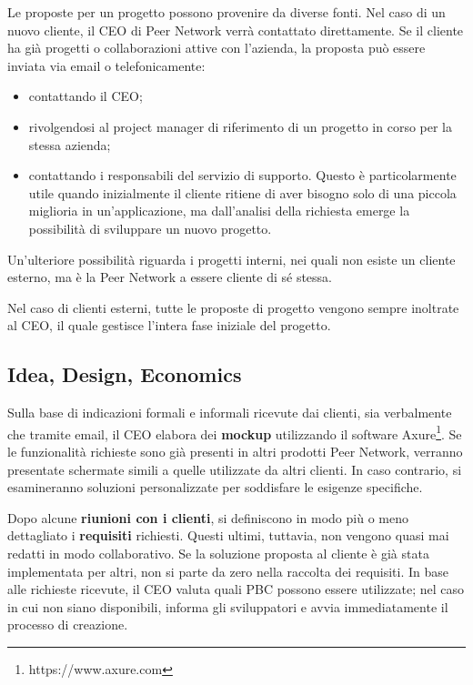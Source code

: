 Le proposte per un progetto possono provenire da diverse fonti. Nel caso di un nuovo cliente, il CEO di Peer Network verrà contattato direttamente.
Se il cliente ha già progetti o collaborazioni attive con l’azienda, la proposta può essere inviata via email o telefonicamente:
\begin{itemize}
    \item contattando il CEO;
    \item rivolgendosi al project manager di riferimento di un progetto in corso per la stessa azienda;
    \item contattando i responsabili del servizio di supporto. Questo è particolarmente utile quando inizialmente 
    il cliente ritiene di aver bisogno solo di una piccola miglioria in un'applicazione, ma dall'analisi della
    richiesta emerge la possibilità di sviluppare un nuovo progetto.
\end{itemize}

Un'ulteriore possibilità riguarda i progetti interni, nei quali non esiste un cliente esterno, ma è la Peer Network a essere cliente di sé stessa.

Nel caso di clienti esterni, tutte le proposte di progetto vengono sempre inoltrate al CEO, il quale gestisce l'intera fase iniziale del progetto.

    \subsection{Idea, Design, Economics}
    Sulla base di indicazioni formali e informali ricevute dai clienti, sia verbalmente che tramite email, il
    CEO elabora dei \textbf{mockup} utilizzando il software Axure\footnote{https://www.axure.com}. Se le funzionalità richieste sono già presenti in altri
    prodotti Peer Network, verranno presentate schermate simili a quelle utilizzate da altri clienti. In caso contrario,
    si esamineranno soluzioni personalizzate per soddisfare le esigenze specifiche.

    Dopo alcune \textbf{riunioni con i clienti}, si definiscono in modo più o meno dettagliato i \textbf{requisiti} richiesti. Questi ultimi,
    tuttavia, non vengono quasi mai redatti in modo collaborativo. Se la soluzione proposta al cliente è già stata
    implementata per altri, non si parte da zero nella raccolta dei requisiti. In base alle richieste ricevute, il CEO
    valuta quali \ac{PBC} possono essere utilizzate; nel caso in cui non siano disponibili, informa gli sviluppatori e avvia
    immediatamente il processo di creazione.


